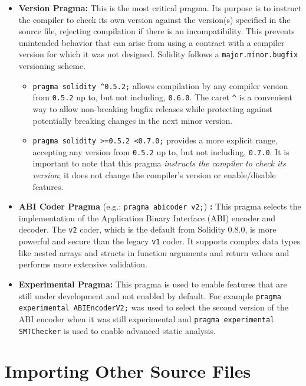 \documentclass{scrbook}
\begin{document}
\begin{itemize}
    \item \textbf{Version Pragma:} This is the most critical pragma. Its purpose is to instruct the compiler to check its own version against the version(s) specified in the source file, rejecting compilation if there is an incompatibility. This prevents unintended behavior that can arise from using a contract with a compiler version for which it was not designed. Solidity follows a \texttt{major.minor.bugfix} versioning scheme.
    \begin{itemize}
        \item \texttt{pragma solidity \textasciicircum0.5.2;} allows compilation by any compiler version from \texttt{0.5.2} up to, but not including, \texttt{0.6.0}. The caret \texttt{\textasciicircum} is a convenient way to allow non-breaking bugfix releases while protecting against potentially breaking changes in the next minor version.
        
        \item \texttt{pragma solidity >=0.5.2 <0.7.0;} provides a more explicit range, accepting any version from \texttt{0.5.2} up to, but not including, \texttt{0.7.0}. It is important to note that this pragma \textit{instructs the compiler to check its version}; it does not change the compiler's version or enable/disable features.
    \end{itemize}
    
    \item \textbf{ABI Coder Pragma} (e.g.: \texttt{pragma abicoder v2;}) \textbf{:} This pragma selects the implementation of the Application Binary Interface (ABI) encoder and decoder. The \texttt{v2} coder, which is the default from Solidity 0.8.0, is more powerful and secure than the legacy \texttt{v1} coder. It supports complex data types like nested arrays and structs in function arguments and return values and performs more extensive validation.
    
    \item \textbf{Experimental Pragma:} This pragma is used to enable features that are still under development and not enabled by default. For example \texttt{pragma experimental ABIEncoderV2;} was used to select the second version of the ABI encoder when it was still experimental and \texttt{pragma experimental SMTChecker} is used to enable advanced static analysis.
\end{itemize}

\section{Importing Other Source Files}
\end{document}
